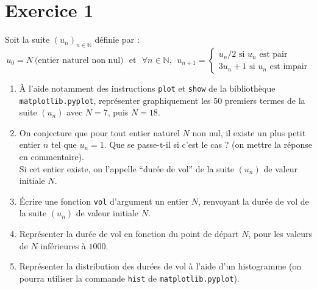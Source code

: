 \section*{Exercice 1} 
Soit la suite $(u_n)_{n\in\mathbb{N}}$  définie par :
$$u_0=N~(\text{entier naturel non nul)~~et~~}\forall n\in \mathbb{N},~~u_{n+1}=\begin{cases} u_n/2 \text{ si }u_n\text{ est pair } \\ 3u_n+1\text{ si }u_n\text{ est impair}\end{cases}$$
\begin{enumerate}
\item \`A l'aide notamment des instructions \texttt{plot} et \texttt{show} de la bibliothèque \texttt{matplotlib.pyplot}, représenter graphiquement les $50$ premiers termes de la suite $(u_n)$ avec $N=7$, puis $N=18$.
\item On conjecture que pour tout entier naturel $N$ non nul, il existe un plus petit entier $n$  tel que $u_n=1$. Que se passe-t-il si c'est le cas ?  (on mettre la réponse en commentaire).\\
Si cet entier existe, on l'appelle ``durée de vol'' de la suite $(u_n)$ de valeur initiale $N$.
\item \'Ecrire une fonction \texttt{vol} d'argument un entier $N$, renvoyant la durée de vol de la suite $(u_n)$ de valeur initiale $N$.
\item Représenter la durée de vol en fonction du point de départ $N$, pour les valeurs de $N$ inférieures à $1000$.
\item Représenter la distribution des durées de vol à l'aide d'un histogramme (on pourra utiliser la commande \texttt{hist} de \texttt{matplotlib.pyplot}).
\end{enumerate}




